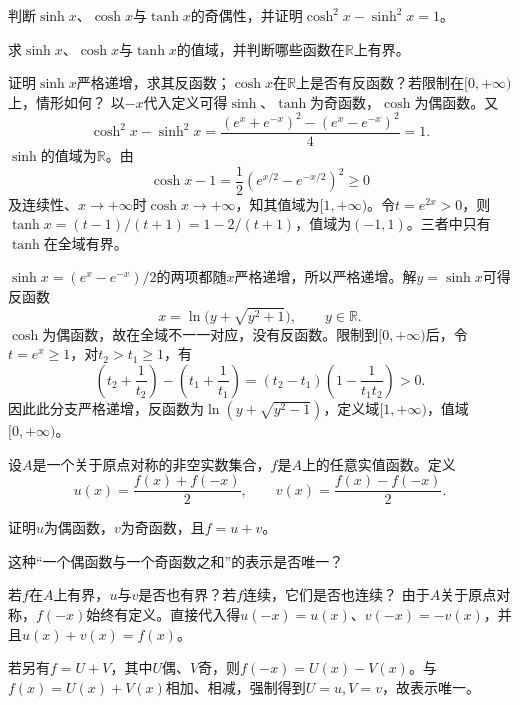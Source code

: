 \quad {}判断\(\sinh x\)、\(\cosh x\)与\(\tanh x\)的奇偶性，并证明\(\cosh^{2} x - \sinh^{2} x = 1\)。

\quad {}求\(\sinh x\)、\(\cosh x\)与\(\tanh x\)的值域，并判断哪些函数在\(\mathbb{R}\)上有界。

\quad {}证明\(\sinh x\)严格递增，求其反函数；\(\cosh x\)在\(\mathbb{R}\)上是否有反函数？若限制在\([0 , + \infty)\)上，情形如何？
\solutionanswer
{}以\(-x\)代入定义可得\(\sinh\)、\(\tanh\)为奇函数，\(\cosh\)为偶函数。又
\[
\cosh^2x-\sinh^2x
=\frac{(e^x+e^{-x})^2-(e^x-e^{-x})^2}{4}=1.
\]
\(\sinh\)的值域为\(\mathbb R\)。由
\[
\cosh x-1=\frac12(e^{x/2}-e^{-x/2})^2\ge0
\]
及连续性、\(x\to+\infty\)时\(\cosh x\to+\infty\)，知其值域为\([1,+\infty)\)。令\(t=e^{2x}>0\)，则\(\tanh x=(t-1)/(t+1)=1-2/(t+1)\)，值域为\((-1,1)\)。三者中只有\(\tanh\)在全域有界。

\(\sinh x=(e^x-e^{-x})/2\)的两项都随\(x\)严格递增，所以严格递增。解\(y=\sinh x\)可得反函数
\[
x=\ln\bigl(y+\sqrt{y^2+1}\bigr),\qquad y\in\mathbb R.
\]
\(\cosh\)为偶函数，故在全域不一一对应，没有反函数。限制到\([0,+\infty)\)后，令\(t=e^x\ge1\)，对\(t_2>t_1\ge1\)，有
\[
\left(t_2+\frac1{t_2}\right)-\left(t_1+\frac1{t_1}\right)
=(t_2-t_1)\left(1-\frac1{t_1t_2}\right)>0.
\]
因此此分支严格递增，反函数为\(\ln(y+\sqrt{y^2-1})\)，定义域\([1,+\infty)\)，值域\([0,+\infty)\)。


设\(A\)是一个关于原点对称的非空实数集合，\(f\)是\(A\)上的任意实值函数。定义
\begin{equation*}
    u(x) = \frac{f(x) + f(-x)}{2} , \qquad
    v(x) = \frac{f(x) - f(-x)}{2} .
\end{equation*}

\quad {}证明\(u\)为偶函数，\(v\)为奇函数，且\(f = u + v\)。

\quad {}这种“一个偶函数与一个奇函数之和”的表示是否唯一？

\quad {}若\(f\)在\(A\)上有界，\(u\)与\(v\)是否也有界？若\(f\)连续，它们是否也连续？
\solutionanswer
{}由于\(A\)关于原点对称，\(f(-x)\)始终有定义。直接代入得\(u(-x)=u(x)\)、\(v(-x)=-v(x)\)，并且\(u(x)+v(x)=f(x)\)。

若另有\(f=U+V\)，其中\(U\)偶、\(V\)奇，则\(f(-x)=U(x)-V(x)\)。与\(f(x)=U(x)+V(x)\)相加、相减，强制得到\(U=u,V=v\)，故表示唯一。

